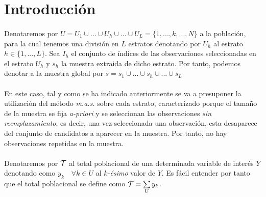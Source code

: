 \documentclass{article}
\begin{document}
  \maketitle



  \section{Introducción}

    \paragraph{}
    Denotaremos por $U = U_1 \cup ... \cup U_h \cup... \cup U_L = \{1, ...,k,...,N\} $ a la población, para la cual tenemos una división en $L$ estratos denotando por $U_h$ al estrato $h \in \{1,..., L\}$. Sea $I_h$ el conjunto de índices de las observaciones seleccionadas en el estrato $U_h$ y $s_h$ la muestra extraida de dicho estrato. Por tanto, podemos denotar a la muestra global por $s = s_1 \cup ... \cup s_h \cup ... \cup s_L$

    \paragraph{}
    En este caso, tal y como se ha indicado anteriormente se va a presuponer la utilización del método \emph{m.a.s.} sobre cada estrato, caracterizado porque el tamaño de la muestra se fija \emph{a-priori} y se seleccionan las observaciones \emph{sin reemplazamiento}, es decir, una vez seleccionada una observación, esta desaparece del conjunto de candidatos a aparecer en la muestra. Por tanto, no hay observaciones repetidas en la muestra.

    \paragraph{}
    Denotaremos por $\mathcal{T}$ al total poblacional de una determinada variable de interés $Y$ denotando como $y_k \quad \forall k \in U$ al \emph{$k$-ésimo} valor de $Y$. Es fácil entender por tanto que el total poblacional se define como $\mathcal{T} = \sum\limits_U y_k$.
\end{document}
